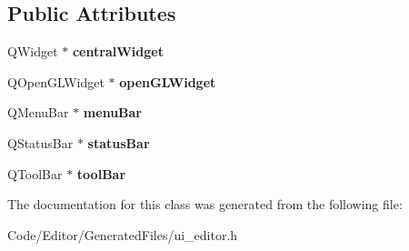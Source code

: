 \subsection*{Public Attributes}
\begin{DoxyCompactItemize}
\item 
Q\+Widget $\ast$ {\bfseries central\+Widget}\hypertarget{class_ui___editor_class_a525ec050f091d3e48b55711112232bb9}{}\label{class_ui___editor_class_a525ec050f091d3e48b55711112232bb9}

\item 
Q\+Open\+G\+L\+Widget $\ast$ {\bfseries open\+G\+L\+Widget}\hypertarget{class_ui___editor_class_a5566cbfc4ae4364276951eaf69437d85}{}\label{class_ui___editor_class_a5566cbfc4ae4364276951eaf69437d85}

\item 
Q\+Menu\+Bar $\ast$ {\bfseries menu\+Bar}\hypertarget{class_ui___editor_class_a30ef25f4be408e5b261f12de92beb7cf}{}\label{class_ui___editor_class_a30ef25f4be408e5b261f12de92beb7cf}

\item 
Q\+Status\+Bar $\ast$ {\bfseries status\+Bar}\hypertarget{class_ui___editor_class_ad4cfe02ed6c3e92ab850538dce94e14a}{}\label{class_ui___editor_class_ad4cfe02ed6c3e92ab850538dce94e14a}

\item 
Q\+Tool\+Bar $\ast$ {\bfseries tool\+Bar}\hypertarget{class_ui___editor_class_ad46d7fa316abbe924d4b5471cd76ebb1}{}\label{class_ui___editor_class_ad46d7fa316abbe924d4b5471cd76ebb1}

\end{DoxyCompactItemize}


The documentation for this class was generated from the following file\+:\begin{DoxyCompactItemize}
\item 
Code/\+Editor/\+Generated\+Files/ui\+\_\+editor.\+h\end{DoxyCompactItemize}
